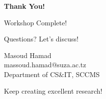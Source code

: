 \documentclass[aspectratio=169]{beamer}
\begin{document}
	\begin{frame}[plain]
		\centering
		\vspace{2em}
		
		{\Huge\textbf{Thank You!}}
		
		\vspace{2em}
		
		{\large Workshop Complete!}
		
		\vspace{2em}
		
		{\normalsize Questions? Let's discuss!}
		
		\vspace{2em}
		
		Masoud Hamad\\
		massoud.hamad@suza.ac.tz\\
		Department of CS\&IT, SCCMS
		
		\vspace{2em}
		
		{\small Keep creating excellent research!}
	\end{frame}
	
\end{document}
